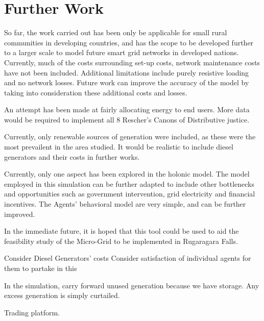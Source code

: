 \chapter{Further Work}
\label{Further Work}

So far, the work carried out has been only be applicable for small rural communities in developing countries, and has the scope to be developed further to a larger scale to model future smart grid networks in developed nations. Currently, much of the costs surrounding set-up costs, network maintenance costs have not been included. Additional limitations include purely resistive loading and no network losses. Future work can improve the accuracy of the model by taking into consideration these additional costs and losses.

An attempt has been made at fairly allocating energy to end users. More data would be required to implement all 8 Rescher's Canons of Distributive justice. 

Currently, only renewable sources of generation were included, as these were the most prevailent in the area studied. It would be realistic to include diesel generators and their costs in further works.

Currently, only one aspect has been explored in the holonic model. The model employed in this simulation can be further adapted to include other bottlenecks and opportunities such as government intervention, grid electricity and financial incentives. The Agents' behavioral model are very simple, and can be further improved.

In the immediate future, it is hoped that this tool could be used to aid the feasibility study of the Micro-Grid to be implemented in Rugaragara Falls. 

Consider Diesel Generators' costs 
Consider satisfaction of individual agents for them to partake in this

In the simulation, carry forward unused generation because we have storage. Any excess generation is simply curtailed.

Trading platform.
